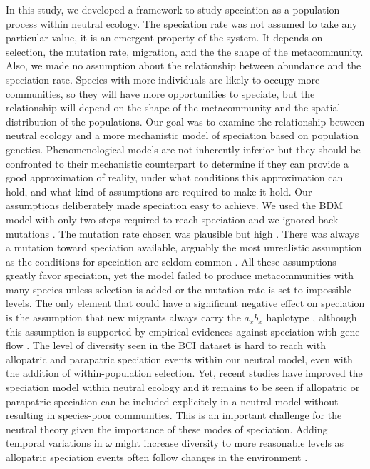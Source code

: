 \documentclass[letterpaper,twocolumn,superscriptaddress,showkeys]{revtex4}
\begin{document}
In this study, we developed a framework to study speciation as a population-process within neutral ecology. The speciation rate was not assumed to take any particular value, it is an emergent property of the system. It depends on selection, the mutation rate, migration, and the the shape of the metacommunity. Also, we made no assumption about the relationship between abundance and the speciation rate. Species with more individuals are likely to occupy more communities, so they will have more opportunities to speciate, but the relationship will depend on the shape of the metacommunity and the spatial distribution of the populations. Our goal was to examine the relationship between neutral ecology and a more mechanistic model of speciation based on population genetics. Phenomenological models are not inherently inferior \cite{mcg10} but they should be confronted to their mechanistic counterpart to determine if they can provide a good approximation of reality, under what conditions this approximation can hold, and what kind of assumptions are required to make it hold. Our assumptions deliberately made speciation easy to achieve. We used the BDM model with only two steps required to reach speciation and we ignored back mutations \cite{gav04}. The mutation rate chosen was plausible but high \cite{dra98,kum02}. There was always a mutation toward speciation available, arguably the most unrealistic assumption as the conditions for speciation are seldom common \cite{coy04}. All these assumptions greatly favor speciation, yet the model failed to produce metacommunities with many species unless selection is added or the mutation rate is set to impossible levels. The only element that could have a significant negative effect on speciation is the assumption that new migrants always carry the $a_xb_x$ haplotype \cite{gav04}, although this assumption is supported by empirical evidences against speciation with gene flow \cite{coy04}. The level of diversity seen in the BCI dataset is hard to reach with allopatric and parapatric speciation events within our neutral model, even with the addition of within-population selection. Yet, recent studies have improved the speciation model within neutral ecology \cite{ros10,ros11} and it remains to be seen if allopatric or parapatric speciation can be included explicitely in a neutral model without resulting in species-poor communities. This is an important challenge for the neutral theory given the importance of these modes of speciation. Adding temporal variations in $\omega$ might increase diversity to more reasonable levels as allopatric speciation events often follow changes in the environment \cite{coy04}.
\end{document}
